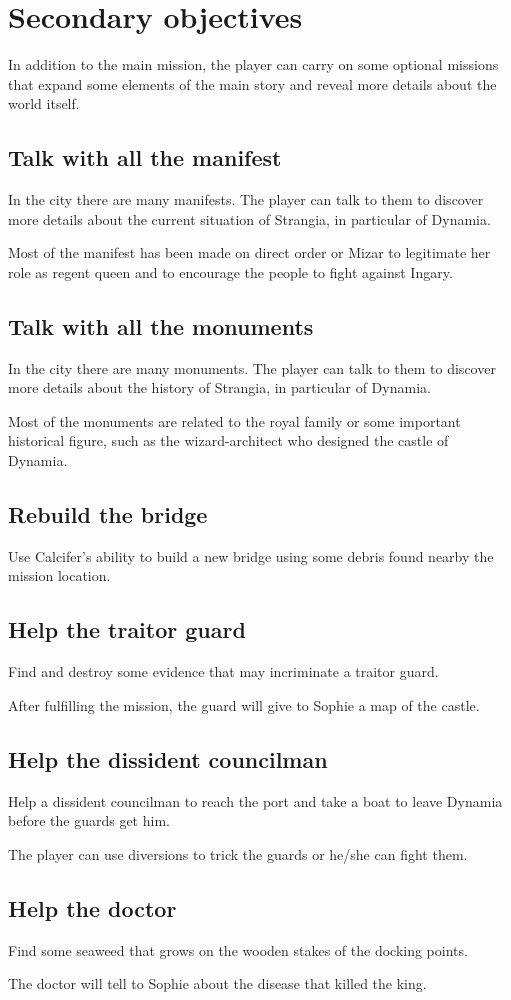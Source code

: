 \section{Secondary objectives}
In addition to the main mission, the player can carry on some optional missions that expand some elements of the main story and reveal more details about the world itself.

\subsection{Talk with all the manifest}
In the city there are many manifests. The player can talk to them to discover more details about the current situation of Strangia, in particular of Dynamia.

Most of the manifest has been made on direct order or Mizar to legitimate her role as regent queen and to encourage the people to fight against Ingary.

\subsection{Talk with all the monuments}
In the city there are many monuments. The player can talk to them to discover more details about the history of Strangia, in particular of Dynamia.

Most of the monuments are related to the royal family or some important historical figure, such as the wizard-architect who designed the castle of Dynamia.

\subsection{Rebuild the bridge}
Use Calcifer's ability to build a new bridge using some debris found nearby the mission location.

\subsection{Help the traitor guard}
Find and destroy some evidence that may incriminate a traitor guard.

After fulfilling the mission, the guard will give to Sophie a map of the castle.

\subsection{Help the dissident councilman}
Help a dissident councilman to reach the port and take a boat to leave Dynamia before the guards get him.

The player can use diversions to trick the guards or he/she can fight them.

\subsection{Help the doctor}
Find some seaweed that grows on the wooden stakes of the docking points.

The doctor will tell to Sophie about the disease that killed the king.

